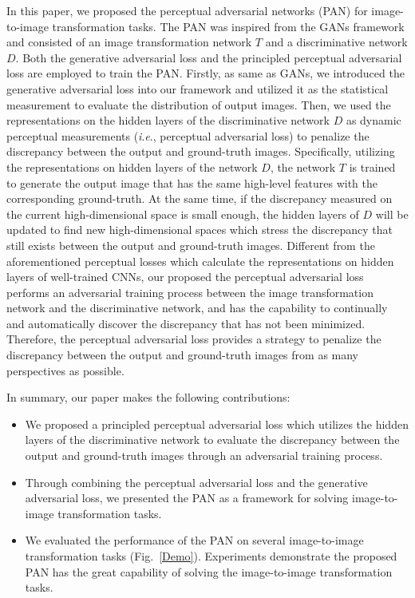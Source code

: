 \documentclass{article}
\newcommand{\ie}{\textit{i}.\textit{e}.}
\begin{document}
In this paper, we proposed the perceptual adversarial networks (PAN) for image-to-image transformation tasks. The PAN was inspired from the GANs framework and consisted of an image transformation network $T$ and a discriminative network 
$D$. Both the generative adversarial loss and the principled perceptual adversarial loss are employed to train the PAN. 
Firstly, as same as GANs, we introduced the generative adversarial loss into our framework and utilized it as the statistical measurement to evaluate the distribution of output images. Then, we used the representations on the hidden layers of the discriminative network $D$ as dynamic perceptual measurements (\ie, perceptual adversarial loss) to penalize the discrepancy between the output and ground-truth images. Specifically, utilizing the representations on hidden layers of the network $D$, the network $T$ is trained to generate the output image that has the same high-level features with the corresponding ground-truth. At the same time, if the discrepancy measured on the current high-dimensional space is small enough, the hidden layers of $D$ will be updated to find new high-dimensional spaces which stress the discrepancy that still exists between the output and ground-truth images. Different from the aforementioned perceptual losses which calculate the representations on hidden layers of well-trained CNNs, our proposed the perceptual adversarial loss performs an adversarial training process between the image transformation network and the discriminative network, and has the capability to continually and automatically discover the discrepancy that has not been minimized. Therefore, the perceptual adversarial loss provides a strategy to penalize the discrepancy between the output and ground-truth images from as many perspectives as possible.

 In summary, our paper makes the following contributions: 

\begin{itemize}
\item We proposed a principled perceptual adversarial loss which utilizes the hidden layers of the discriminative network to evaluate the discrepancy between the output and ground-truth images through an adversarial training process.

\item Through combining the perceptual adversarial loss and the generative adversarial loss, we presented the PAN as a framework for solving image-to-image transformation tasks.

\item We evaluated the performance of the PAN on several image-to-image transformation tasks (Fig.~\ref{Demo}). Experiments demonstrate the proposed PAN has the great capability of solving the image-to-image transformation tasks.
\end{itemize}
\end{document}
